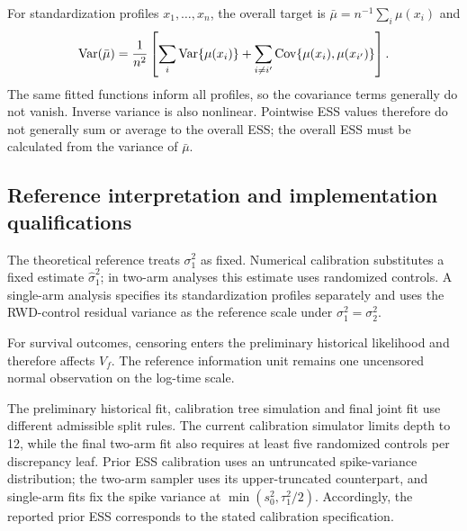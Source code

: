 For standardization profiles $x_1,\ldots,x_n$, the overall target is $\bar\mu=n^{-1}\sum_i\mu(x_i)$ and
\begin{equation}\label{eq:nonadd}
\operatorname{Var}(\bar\mu)
=\frac1{n^2}\left[
\sum_i\operatorname{Var}\{\mu(x_i)\}
+\sum_{i\ne i'}\operatorname{Cov}\{\mu(x_i),\mu(x_{i'})\}
\right].
\end{equation}
The same fitted functions inform all profiles, so the covariance terms generally do not vanish. Inverse variance is also nonlinear. Pointwise ESS values therefore do not generally sum or average to the overall ESS; the overall ESS must be calculated from the variance of $\bar\mu$.

\subsection{Reference interpretation and implementation qualifications}\label{sec:B.7}
The theoretical reference treats $\sigma_1^2$ as fixed. Numerical calibration substitutes a fixed estimate $\widehat\sigma_1^2$; in two-arm analyses this estimate uses randomized controls. A single-arm analysis specifies its standardization profiles separately and uses the RWD-control residual variance as the reference scale under $\sigma_1^2=\sigma_2^2$.

For survival outcomes, censoring enters the preliminary historical likelihood and therefore affects $V_f$. The reference information unit remains one uncensored normal observation on the log-time scale.

The preliminary historical fit, calibration tree simulation and final joint fit use different admissible split rules. The current calibration simulator limits depth to 12, while the final two-arm fit also requires at least five randomized controls per discrepancy leaf. Prior ESS calibration uses an untruncated spike-variance distribution; the two-arm sampler uses its upper-truncated counterpart, and single-arm fits fix the spike variance at $\min(s_0^2,\tau_1^2/2)$. Accordingly, the reported prior ESS corresponds to the stated calibration specification.
